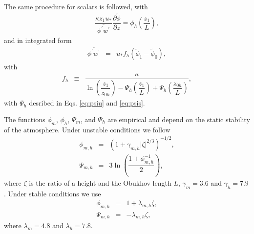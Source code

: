 \documentclass[gmd,manuscript]{copernicus}
\newcommand{\phif}{\ensuremath{\widetilde{\phi}}}
\begin{document}
The same procedure for scalars is followed, with
\begin{eqnarray}
\dfrac{\kappa z_1 u_*}{\overline{\phi^\prime w^\prime}} \dfrac{\partial \phif}{\partial z} =
\phi_h \left( \dfrac{z_1}{L} \right),
\end{eqnarray}
and in integrated form
\begin{eqnarray}
\overline{\phi^\prime w^\prime} & = & u_* f_h \left( \phif_1 - \phif_0 \right),
\end{eqnarray}
with
\begin{eqnarray}
f_h & \equiv &
\dfrac{\kappa}
{ \ln{\left( \dfrac{z_1}{z_{0h}} \right)}
	- \varPsi_h \left( \dfrac{z_1}{L} \right)
	+ \varPsi_h \left( \dfrac{z_{0h}}{L} \right) }, \label{eq:fh}
\end{eqnarray}
with $\varPsi_h$ desribed in Eqs. \ref{eq:psiu} and \ref{eq:psis}.

The functions $\phi_m$, $\phi_h$, $\varPsi_m$, and $\varPsi_h$ are empirical and depend on the static stability of the atmosphere. Under unstable conditions we follow \citep{Wilson2001, Wyngaard2010} 
\begin{eqnarray}
\phi_{m,h} & = & \left( 1 + \gamma_{m,h} \left| \zeta \right|^{2/3} \right)^{-1/2},\label{eq:phiu}\\
\varPsi_{m,h} & = & 3 \ln{\left( \dfrac{1 + \phi_{m,h}^{-1}}{2} \right)},\label{eq:psiu} 
\end{eqnarray}
where $\zeta$ is the ratio of a height and the Obukhov length $L$, $\gamma_m = 3.6$ and $\gamma_h = 7.9$. Under stable conditions we use \citep{Hogstrom1988, Wyngaard2010}
\begin{eqnarray}
\phi_{m,h} & = & 1 + \lambda_{m,h} \zeta, \label{eq:phis}\\
\varPsi_{m,h} & = & - \lambda_{m,h} \zeta, \label{eq:psis}
\end{eqnarray}
where $\lambda_m = 4.8$ and $\lambda_h = 7.8$.
\end{document}
